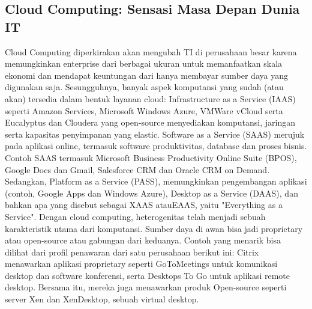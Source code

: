 \subsection{Cloud Computing: Sensasi Masa Depan Dunia IT}
\tab Cloud Computing diperkirakan akan mengubah TI di perusahaan besar karena memungkinkan enterprise dari berbagai ukuran untuk memanfaatkan skala ekonomi dan mendapat keuntungan dari hanya membayar sumber daya yang digunakan saja. Sesungguhnya, banyak aspek komputansi yang sudah (atau akan) tersedia dalam bentuk layanan cloud: Infrastructure as a Service (IAAS) seperti Amazon Services, Microsoft Windows Azure, VMWare vCloud serta Eucalyptus dan Cloudera yang open-source menyediakan komputansi, jaringan serta kapasitas penyimpanan yang elastic. Software as a Service (SAAS) merujuk pada aplikasi online, termasuk software produktivitas, database dan proses bisnis. \\Contoh SAAS termasuk Microsoft Business Productivity Online Suite (BPOS), Google Docs dan Gmail, Salesforce CRM dan Oracle CRM on Demand. Sedangkan, Platform as a Service (PASS), memungkinkan pengembangan aplikasi (contoh, Google Apps dan Windows Azure), Desktop as a Service (DAAS), dan bahkan apa yang disebut sebagai XAAS atauEAAS, yaitu "Everything as a Service". Dengan cloud computing, heterogenitas telah menjadi sebuah karakteristik utama dari komputansi. Sumber daya di awan bisa jadi proprietary atau open-source atau gabungan dari keduanya. Contoh yang menarik bisa dilihat dari profil penawaran dari satu perusahaan berikut ini: Citrix menawarkan aplikasi proprietary seperti GoToMeetings untuk komunikasi desktop dan software konferensi, serta Desktops To Go untuk aplikasi remote desktop. Bersama itu, mereka juga menawarkan produk Open-source seperti server Xen dan XenDesktop, sebuah virtual desktop.
